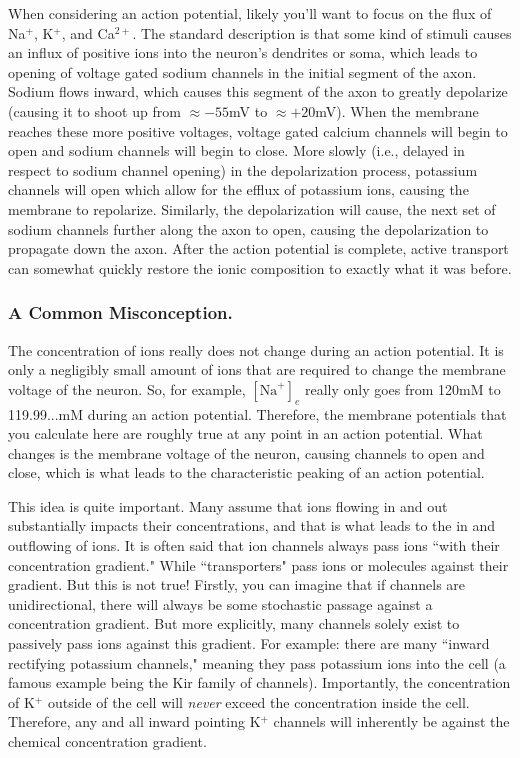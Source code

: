 \documentclass[12pt]{report}
\begin{document}
When considering an action potential, likely you'll want to focus on the flux of Na$^+$, K$^+$, and Ca$^{2+}$. The standard description is that some kind of stimuli causes an influx of positive ions into the neuron's dendrites or soma, which leads to opening of voltage gated sodium channels in the initial segment of the axon. Sodium flows inward, which causes this segment of the axon to greatly depolarize (causing it to shoot up from $\approx -55$mV to $\approx +20$mV). When the membrane reaches these more positive voltages, voltage gated calcium channels will begin to open and sodium channels will begin to close. More slowly (i.e., delayed in respect to sodium channel opening) in the depolarization process, potassium channels will open which allow for the efflux of potassium ions, causing the membrane to repolarize.  Similarly, the depolarization will cause, the next set of sodium channels further along the axon to open, causing the depolarization to propagate down the axon. After the action potential is complete, active transport can somewhat quickly restore the ionic composition to exactly what it was before.\newline


\subsubsection{A Common Misconception.}

The concentration of ions really does not change during an action potential. It is only a negligibly small amount of ions that are required to change the membrane voltage of the neuron. So, for example, $[\mathrm{Na}^+]_e$ really only goes from 120mM to 119.99...mM during an action potential. Therefore, the membrane potentials that you calculate here are roughly true at any point in an action potential. What changes is the membrane voltage of the neuron, causing channels to open and close, which is what leads to the characteristic peaking of an action potential.\newline

This idea is quite important. Many assume that ions flowing in and out substantially impacts their concentrations, and that is what leads to the in and outflowing of ions. It is often said that ion channels always pass ions ``with their concentration gradient." While ``transporters" pass ions or molecules against their gradient. But this is not true! Firstly, you can imagine that if channels are unidirectional, there will always be some stochastic passage against a concentration gradient. But more explicitly, many channels solely exist to passively pass ions against this gradient. For example: there are many ``inward rectifying potassium channels," meaning they pass potassium ions into the cell (a famous example being the Kir family of channels). Importantly, the concentration of K$^+$ outside of the cell will \textit{never} exceed the concentration inside the cell. Therefore, any and all inward pointing K$^+$ channels will inherently be against the chemical concentration gradient.\newline
\end{document}

